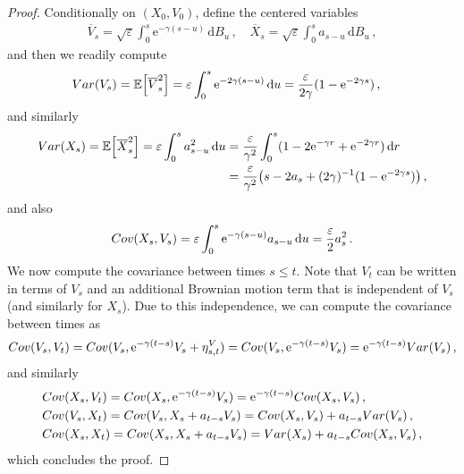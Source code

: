 \documentclass[10pt,a4paper]{amsart}
\newcommand{\bb}{\mathbb}
\newcommand{\dd}{\,\mathrm{d}}
\newcommand{\eps}{\varepsilon}
\newcommand{\rme}{\mathrm{e}}
\begin{document}
\begin{proof}
Conditionally on $(X_0,V_0)$, define the centered variables
\begin{align*}
    \overline{V}_s = \sqrt{\eps}\int_0^s \rme^{-\gamma(s-u)}\dd B_u\,, \quad \overline{X}_s = \sqrt{\eps}\int_0^s a_{s-u}\dd B_u\,,
\end{align*}
and then we readily compute
\begin{align*}
    &{\rm Var}(V_s) = \bb E\Bigl[\overline{V}_s^2\Bigr] = \eps \int_0^s \rme^{-2\gamma(s-u)}\dd u = \frac{\eps}{2\gamma}(1-\rme^{-2\gamma s})\,,
\end{align*}
and similarly
\begin{align*}
{\rm Var}(X_s) = \bb E\Bigl[\overline{X}_s^2\Bigr] = \eps \int_0^s a_{s-u}^2 \dd u  &= \frac{\eps}{\gamma^2}\int_0^s (1 - 2\rme^{-\gamma r} + \rme^{-2\gamma r}) \dd r \\
&= \frac{\eps}{\gamma^2}\bigl(s - 2a_s + (2\gamma)^{-1}(1-\rme^{-2\gamma s}) \bigr)\,,
\end{align*}
and also
\begin{align*}
    {\rm Cov}(X_s,V_s) = \eps \int_0^s \rme^{-\gamma(s-u)} a_{s-u} \dd u = \frac{\eps}{2}a_s^2\,.
\end{align*}
We now compute the covariance between times $s \leq t$. Note that $V_t$ can be written in terms of $V_s$ and an additional Brownian motion term that is independent of $V_s$ (and similarly for $X_s$). Due to this independence, we can compute the covariance between times as
\begin{align*}
    {\rm Cov}(V_s,V_t) = {\rm Cov}(V_s, \rme^{-\gamma (t-s)}V_s + \eta_{s,t}^V) = {\rm Cov}(V_s, \rme^{-\gamma (t-s)}V_s) = \rme^{-\gamma (t-s)}{\rm Var}(V_s)\,,
\end{align*}
and similarly
\begin{align*}
    & {\rm Cov}(X_s,V_t) = {\rm Cov}(X_s, \rme^{-\gamma (t-s)}V_s) = \rme^{-\gamma(t-s)}{\rm Cov}(X_s,V_s)\,, \\
    &{\rm Cov}(V_s,X_t) = {\rm Cov}(V_s, X_s + a_{t-s}V_s) = {\rm Cov}(X_s,V_s) + a_{t-s}{\rm Var}(V_s)\,, \\
    &{\rm Cov}(X_s,X_t) = {\rm Cov}(X_s, X_s + a_{t-s}V_s) = {\rm Var}(X_s) + a_{t-s}{\rm Cov}(X_s,V_s)\,,
\end{align*}
which concludes the proof.
\end{proof}
\end{document}
